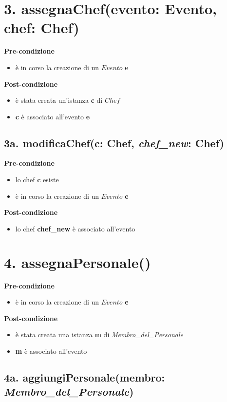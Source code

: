 \documentclass[14pt]{extarticle}
\begin{document}
\section*{3. assegnaChef(evento: Evento, chef: Chef)}

\textbf{Pre-condizione}
\begin{itemize}
  \item è in corso la creazione di un $Evento$ \textbf{e}
\end{itemize}
\textbf{Post-condizione}
\begin{itemize}
  \item è stata creata un'istanza \textbf{c} di  $Chef$
  \item \textbf{c} è associato all'evento \textbf{e}
\end{itemize}


\subsection*{3a. modificaChef(c: Chef, \textit{chef\_new}: Chef)}

\textbf{Pre-condizione}
\begin{itemize}
  \item lo chef \textbf{c} esiste
  \item è in corso la creazione di un $Evento$ \textbf{e}
\end{itemize}
\textbf{Post-condizione}
\begin{itemize}
  \item lo chef \textbf{chef\_new} è associato all'evento
\end{itemize}


\section*{4. assegnaPersonale()}

\textbf{Pre-condizione}
\begin{itemize}
  \item è in corso la creazione di un $Evento$ \textbf{e}
\end{itemize}
\textbf{Post-condizione}
\begin{itemize}
  \item è stata creata una istanza \textbf{m} di \textit{Membro\_del\_Personale}
  \item \textbf{m} è associato all'evento
\end{itemize}


\subsection*{4a. aggiungiPersonale(membro: \textit{Membro\_del\_Personale})}
\end{document}
